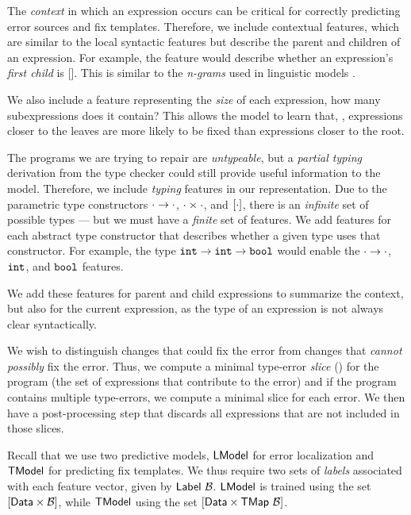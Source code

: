 The \emph{context} in which an expression occurs can be critical for correctly
predicting error sources and fix templates. Therefore, we include contextual
features, which are similar to the local syntactic features but describe the
parent and children of an expression. For example, the \IsNilC feature
would describe whether an expression's \emph{first child} is []. This
is similar
to the \emph{n-grams} used in linguistic models
\citep{Hindle2012-hf,Gabel2010-el}.

We also include a feature representing the \emph{size} of each expression, \ie
how many subexpressions does it contain? This allows the model to learn that,
\eg, expressions closer to the leaves are more likely to be fixed than
expressions closer to the root.

The programs we are trying to repair are \emph{untypeable}, but a \emph{partial
typing} derivation from the type checker could still provide useful information
to the model. Therefore, we include \emph{typing} features in our
representation. Due to the parametric type constructors
$\cdot \to \cdot$, $\cdot \times \cdot$, and $[\cdot]$, there is an
\emph{infinite} set of possible types --- but we must have a \emph{finite} set
of features. We add features for each abstract type constructor that describes whether a
given type uses that constructor. For example, the type
$\mathtt{int} \to \mathtt{int} \to \mathtt{bool}$
would enable the $\cdot \to \cdot$, $\mathtt{int}$, and $\mathtt{bool}$ features.

We add these features for parent and child expressions to summarize the context,
but also for the current expression, as the type of an expression is not always
clear syntactically.

We wish to distinguish changes that could fix the error
from changes that \emph{cannot possibly} fix the error. Thus, we compute a
minimal type-error \emph{slice} (\eg \citep{Tip2001-qp,Haack2003-vc}) for the
program (\ie the set of expressions that contribute to the error) and if the
program contains multiple type-errors, we compute a minimal slice for each
error. We then have a post-processing step that discards all expressions that
are not included in those slices.

Recall that we use two predictive models, $\mathsf{LModel}$ for error localization and
$\mathsf{TModel}$ for predicting fix templates. We thus require two sets of
\emph{labels} associated with each feature vector, given by
$\mathsf{Label}\ \mathcal{B}$. $\mathsf{LModel}$ is trained using the set $[\mathsf{Data} \times
\mathcal{B}]$, while $\mathsf{TModel}$ using the set $[\mathsf{Data} \times
\mathsf{TMap}\ \mathcal{B}]$.

